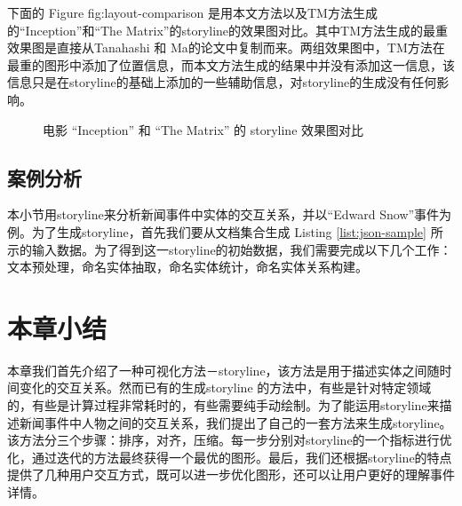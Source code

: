 下面的 Figure {fig:layout-comparison} 是用本文方法以及TM方法生成的“Inception”和“The Matrix”的storyline的效果图对比。其中TM方法生成的最重效果图是直接从Tanahashi 和 Ma\cite{tanahashi2012design}的论文中复制而来。两组效果图中，TM方法在最重的图形中添加了位置信息，而本文方法生成的结果中并没有添加这一信息，该信息只是在storyline的基础上添加的一些辅助信息，对storyline的生成没有任何影响。
\begin{figure}[htb]
	\centering
	\caption{电影 “Inception” 和 “The Matrix” 的 storyline 效果图对比}
	\label{fig:layout-comparison}
\end{figure}

\subsection{案例分析}
本小节用storyline来分析新闻事件中实体的交互关系，并以“Edward Snow”事件为例。为了生成storyline，首先我们要从文档集合生成 Listing \ref{list:json-sample} 所示的输入数据。为了得到这一storyline的初始数据，我们需要完成以下几个工作：文本预处理，命名实体抽取，命名实体统计，命名实体关系构建。


\section{本章小结}
本章我们首先介绍了一种可视化方法－storyline，该方法是用于描述实体之间随时间变化的交互关系。然而已有的生成storyline 的方法中，有些是针对特定领域的，有些是计算过程非常耗时的，有些需要纯手动绘制。为了能运用storyline来描述新闻事件中人物之间的交互关系，我们提出了自己的一套方法来生成storyline。该方法分三个步骤：排序，对齐，压缩。每一步分别对storyline的一个指标进行优化，通过迭代的方法最终获得一个最优的图形。最后，我们还根据storyline的特点提供了几种用户交互方式，既可以进一步优化图形，还可以让用户更好的理解事件详情。

